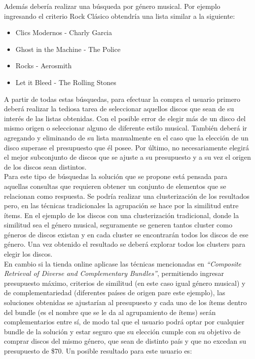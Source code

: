 Además debería realizar una búsqueda por género musical. Por ejemplo ingresando el criterio Rock Clásico obtendría una lista similar a la siguiente:
\begin{itemize}
	\item Clics Modernos - Charly Garcia
	\item Ghost in the Machine - The Police
	\item Rocks - Aerosmith
	\item Let it Bleed - The Rolling Stones
\end{itemize}

A partir de todas estas búsquedas, para efectuar la compra el usuario primero deberá realizar la tediosa tarea de seleccionar aquellos discos que sean de su interés de las listas obtenidas. Con el posible error de elegir más de un disco del mismo origen o seleccionar alguno de diferente estilo musical. También deberá ir agregando y eliminando de su lista manualmente en el caso que la elección de un disco superase el presupuesto que él posee. Por último, no necesariamente elegirá el mejor subconjunto de discos que se ajuste a su presupuesto y a su vez el origen de los discos sean distintos.\\
Para este tipo de búsquedas la solución que se propone está pensada para aquellas consultas que requieren obtener un conjunto de elementos que se relacionan como respuesta. Se podría realizar una clusterización de los resultados pero, en las técnicas tradicionales la agrupación se hace por la similitud entre ítems. En el ejemplo de los discos con una clusterización tradicional, donde la similitud sea el género musical, seguramente se generen tantos cluster como géneros de discos existan y en cada cluster se encontrarán todos los discos de ese género. Una vez obtenido el resultado se deberá explorar todos los clusters para elegir los discos.\\
En cambio si la tienda online aplicase las técnicas mencionadas en \textit{``Composite Retrieval of Diverse and Complementary Bundles''}, permitiendo ingresar presupuesto máximo, criterios de similitud (en este caso igual género musical) y de complementariedad (diferentes países de origen pare este ejemplo), las soluciones obtenidas se ajustarían al presupuesto y cada uno de los ítems dentro del bundle (es el nombre que se le da al agrupamiento de ítems) serán complementarios entre sí, de modo tal que el usuario podrá optar por cualquier bundle de la solución y estar seguro que su elección cumple con su objetivo de comprar discos del mismo género, que sean de distinto país y que no excedan su presupuesto de \$70. Un posible resultado para este usuario es:
